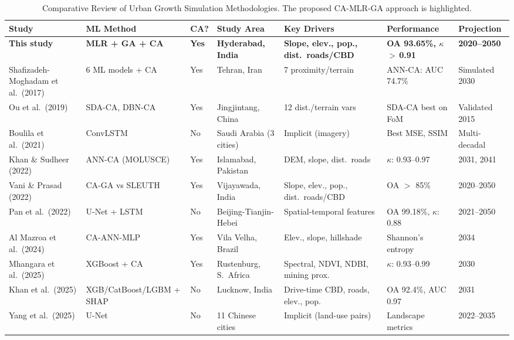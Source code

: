 \documentclass[conference]{IEEEtran}
\begin{document}
\begin{table}[!t]
\caption{Comparative Review of Urban Growth Simulation Methodologies. The proposed CA-MLR-GA approach is highlighted.}
\label{tab:litreview}
\centering
\scriptsize
\renewcommand{\arraystretch}{1.25}
\begin{tabular}{p{2.6cm}p{2.4cm}p{1.0cm}p{2.2cm}p{2.2cm}p{2.2cm}p{2.0cm}}
\toprule
\textbf{Study} & \textbf{ML Method} & \textbf{CA?} & \textbf{Study Area} & \textbf{Key Drivers} & \textbf{Performance} & \textbf{Projection} \\
\midrule
\textbf{This study} & \textbf{MLR + GA + CA} & \textbf{Yes} & \textbf{Hyderabad, India} & \textbf{Slope, elev., pop., dist.\ roads/CBD} & \textbf{OA 93.65\%, $\kappa$\,$>$\,0.91} & \textbf{2020--2050} \\
\midrule
Shafizadeh-Moghadam et al.\ (2017) \cite{shafizadeh2017} & 6 ML models + CA & Yes & Tehran, Iran & 7 proximity/terrain & ANN-CA: AUC 74.7\% & Simulated 2030 \\
Ou et al.\ (2019) \cite{ou2019} & SDA-CA, DBN-CA & Yes & Jingjintang, China & 12 dist./terrain vars & SDA-CA best on FoM & Validated 2015 \\
Boulila et al.\ (2021) \cite{boulila2021} & ConvLSTM & No & Saudi Arabia (3 cities) & Implicit (imagery) & Best MSE, SSIM & Multi-decadal \\
Khan \& Sudheer (2022) \cite{khan2022} & ANN-CA (MOLUSCE) & Yes & Islamabad, Pakistan & DEM, slope, dist.\ roads & $\kappa$: 0.93--0.97 & 2031, 2041 \\
Vani \& Prasad (2022) \cite{vani2022} & CA-GA vs SLEUTH & Yes & Vijayawada, India & Slope, elev., pop., dist.\ roads/CBD & OA $>$ 85\% & 2020--2050 \\
Pan et al.\ (2022) \cite{pan2022} & U-Net + LSTM & No & Beijing-Tianjin-Hebei & Spatial-temporal features & OA 99.18\%, $\kappa$: 0.88 & 2021--2050 \\
Al Mazroa et al.\ (2024) \cite{almazroa2024} & CA-ANN-MLP & Yes & Vila Velha, Brazil & Elev., slope, hillshade & Shannon's entropy & 2034 \\
Mhangara et al.\ (2025) \cite{mhangara2025} & XGBoost + CA & Yes & Rustenburg, S.\ Africa & Spectral, NDVI, NDBI, mining prox. & $\kappa$: 0.93--0.99 & 2030 \\
Khan et al.\ (2025) \cite{khan2025} & XGB/CatBoost/LGBM + SHAP & No & Lucknow, India & Drive-time CBD, roads, elev., pop. & OA 92.4\%, AUC 0.97 & 2031 \\
Yang et al.\ (2025) \cite{yang2025} & U-Net & No & 11 Chinese cities & Implicit (land-use pairs) & Landscape metrics & 2022--2035 \\
\bottomrule
\end{tabular}
\end{table}
\end{document}
